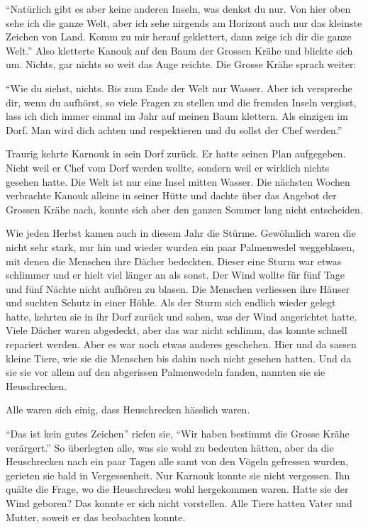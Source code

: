 \enquote{Natürlich gibt es aber keine anderen Inseln, was denkst du nur. Von hier oben sehe ich die ganze Welt, aber ich sehe nirgends am Horizont auch nur das kleinste Zeichen von Land. Komm zu mir herauf geklettert, dann zeige ich dir die ganze Welt.} Also kletterte Kanouk auf den Baum der Grossen Krähe und blickte sich um. Nichts, gar nichts so weit das Auge reichte. Die Grosse Krähe sprach weiter:

\enquote{Wie du siehst, nichts. Bis zum Ende der Welt nur Wasser. Aber ich verspreche dir, wenn du aufhörst, so viele Fragen zu stellen und die fremden Inseln vergisst, lass ich dich immer einmal im Jahr auf meinen Baum klettern. Als einzigen im Dorf. Man wird dich achten und respektieren und du sollst der Chef werden.}

Traurig kehrte Karnouk in sein Dorf zurück. Er hatte seinen Plan aufgegeben. Nicht weil er Chef vom Dorf werden wollte, sondern weil er wirklich nichts gesehen hatte. Die Welt ist nur eine Insel mitten Wasser. Die nächsten Wochen verbrachte Kanouk alleine in seiner Hütte und dachte über das Angebot der Grossen Krähe nach, konnte sich aber den ganzen Sommer lang nicht entscheiden.

Wie jeden Herbst kamen auch in diesem Jahr die Stürme. Gewöhnlich waren die nicht sehr stark, nur hin und wieder wurden ein paar Palmenwedel weggeblasen, mit denen die Menschen ihre Dächer bedeckten. Dieser eine Sturm war etwas schlimmer und er hielt viel länger an als sonst. Der Wind wollte für fünf Tage und fünf Nächte nicht aufhören zu blasen. Die Menschen verliessen ihre Häuser und suchten Schutz in einer Höhle. Als der Sturm sich endlich wieder gelegt hatte, kehrten sie in ihr Dorf zurück und sahen, was der Wind angerichtet hatte. Viele Dächer waren abgedeckt, aber das war nicht schlimm, das konnte schnell repariert werden. Aber es war noch etwas anderes geschehen. Hier und da sassen kleine Tiere, wie sie die Menschen bis dahin noch nicht gesehen hatten. Und da sie sie vor allem auf den abgerissen Palmenwedeln fanden, nannten sie sie Heuschrecken. 

Alle waren sich einig, dass Heuschrecken hässlich waren. 

\enquote{Das ist kein gutes Zeichen} riefen sie, \enquote{Wir haben bestimmt die Grosse Krähe verärgert.} So überlegten alle, was sie wohl zu bedeuten hätten, aber da die Heuschrecken nach ein paar Tagen alle samt von den Vögeln gefressen wurden, gerieten sie bald in Vergessenheit. Nur Karnouk konnte sie nicht vergessen. Ihn quälte die Frage, wo die Heuschrecken wohl hergekommen waren. Hatte sie der Wind geboren? Das konnte er sich nicht vorstellen. Alle Tiere hatten Vater und Mutter, soweit er das beobachten konnte. 

